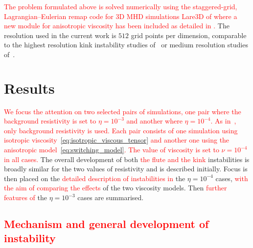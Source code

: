 \documentclass[12pt]{article}
\newcommand{\rs}[2]{\textcolor{red}{#2}}
\begin{document}
\rs{}{The problem formulated above is solved numerically using the
  staggered-grid, Lagrangian–Eulerian remap code for 3D MHD
  simulations Lare3D of \cite{arberStaggeredGridLagrangian2001} where
  a  new module for anisotropic viscosity has been
  included as detailed in \cite{Quinn2021}.} The resolution used in the
current work is  $512$ grid points per dimension, comparable to the
highest resolution kink instability studies
of~\cite{hoodCoronalHeatingMagnetic2009} or medium resolution studies
of~\cite{barefordShockHeatingNumerical2015}. 

\section{Results}

\rs{Two pairs of simulations were performed,}{We focus the attention
on two selected pairs of  
simulations, one pair where the background resistivity is set to
$\eta=10^{-3}$ and another where $\eta=10^{-4}$. As
in~\cite{quinnEffectAnisotropicViscosity2020a}, only background
resistivity is used. Each pair consists of one simulation
using isotropic viscosity~\eqref{eq:isotropic_viscous_tensor} and
another one using the \rs{switching}{anisotropic} model~\eqref{eq:switching_model}. The
value of viscosity is set to $\nu = 10^{-4}$ in all cases.} 
%
The overall development of both \rs{}{the flute and the kink}
instabilities is broadly similar for the two values of resistivity and
is described  initially. Focus is 
then placed on the \rs{development of}{detailed description of instabilities in} the
$\eta=10^{-4}$ cases, \rs{comparing the results}{with the aim of comparing the effects} of the two
viscosity models. \rs{These cases illustrate the development of the instabilities while showcasing the effect of the
viscosity models.}{} Then \rs{differences apparent in}{further features of} the $\eta=10^{-3}$
cases are summarised. \rs{without a full exploration of the (qualitatively
similar) results.}{}

\subsection{\rs{Overview of instability development}{Mechanism and
    general development of instability}}
\end{document}
